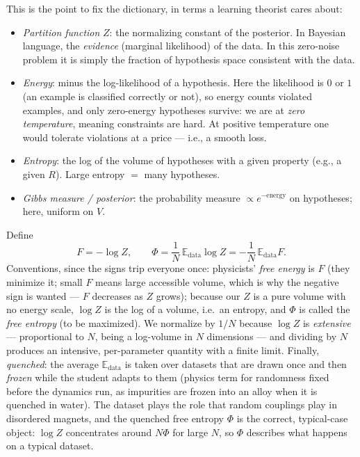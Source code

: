 \documentclass[11pt]{article}
\newcommand{\E}{\mathbb{E}}
\begin{document}
This is the point to fix the dictionary, in terms a learning theorist
cares about:
\begin{itemize}
  \item \emph{Partition function} $Z$: the normalizing constant of the
  posterior. In Bayesian language, the \emph{evidence} (marginal
  likelihood) of the data. In this zero-noise problem it is simply the
  fraction of hypothesis space consistent with the data.
  \item \emph{Energy}: minus the log-likelihood of a hypothesis. Here the
  likelihood is $0$ or $1$ (an example is classified correctly or not),
  so energy counts violated examples, and only zero-energy hypotheses
  survive: we are at \emph{zero temperature}, meaning constraints are hard.
  At positive temperature one would tolerate violations at a price ---
  i.e., a smooth loss.
  \item \emph{Entropy}: the log of the volume of hypotheses with a given
  property (e.g., a given $R$). Large entropy $=$ many hypotheses.
  \item \emph{Gibbs measure / posterior}: the probability measure
  $\propto e^{-\text{energy}}$ on hypotheses; here, uniform on $V$.
\end{itemize}
Define
\begin{equation}
  \label{eq:free-entropy-def}
  F = -\log Z, \qquad
  \Phi = \frac{1}{N}\,\E_{\mathrm{data}} \log Z = -\frac{1}{N}\,
  \E_{\mathrm{data}} F .
\end{equation}
Conventions, since the signs trip everyone once: physicists' \emph{free
energy} is $F$ (they minimize it; small $F$ means large accessible volume,
which is why the negative sign is wanted --- $F$ decreases as
$Z$ grows); because our $Z$ is a pure volume with no energy scale, $\log Z$
is the log of a volume, i.e.\ an entropy, and $\Phi$ is called the
\emph{free entropy} (to be maximized). We normalize by $1/N$ because
$\log Z$ is \emph{extensive} --- proportional to $N$, being a log-volume in
$N$ dimensions --- and dividing by $N$ produces an intensive,
per-parameter quantity with a finite limit. Finally, \emph{quenched}: the
average $\E_{\mathrm{data}}$ is taken over datasets that are drawn once and
then \emph{frozen} while the student adapts to them (physics term for
randomness fixed before the dynamics run, as impurities are frozen into an
alloy when it is quenched in water). The dataset plays the role that random
couplings play in disordered magnets, and the quenched free entropy $\Phi$
is the correct, typical-case object: $\log Z$ concentrates around
$N\Phi$ for large $N$, so $\Phi$ describes what happens on a typical
dataset.
\end{document}
